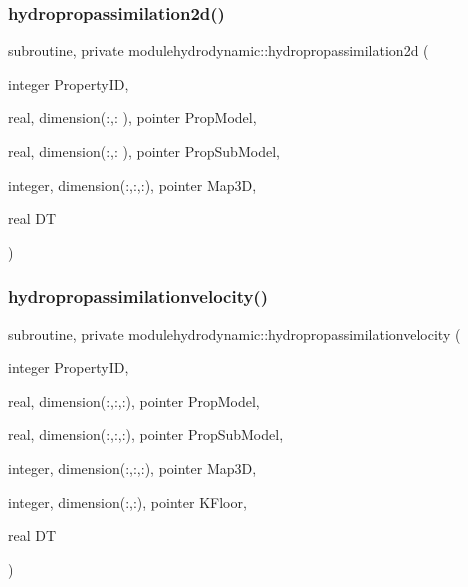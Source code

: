 \subsubsection{\texorpdfstring{hydropropassimilation2d()}{hydropropassimilation2d()}}
{\footnotesize\ttfamily subroutine, private modulehydrodynamic\+::hydropropassimilation2d (\begin{DoxyParamCaption}\item[{integer}]{Property\+ID,  }\item[{real, dimension(\+:,\+:  ), pointer}]{Prop\+Model,  }\item[{real, dimension(\+:,\+:  ), pointer}]{Prop\+Sub\+Model,  }\item[{integer, dimension(\+:,\+:,\+:), pointer}]{Map3D,  }\item[{real}]{DT }\end{DoxyParamCaption})\hspace{0.3cm}{\ttfamily [private]}}

\mbox{\label{namespacemodulehydrodynamic_a1979e519c233cd0af0ad00eab566a414}} 
\subsubsection{\texorpdfstring{hydropropassimilationvelocity()}{hydropropassimilationvelocity()}}
{\footnotesize\ttfamily subroutine, private modulehydrodynamic\+::hydropropassimilationvelocity (\begin{DoxyParamCaption}\item[{integer}]{Property\+ID,  }\item[{real, dimension(\+:,\+:,\+:), pointer}]{Prop\+Model,  }\item[{real, dimension(\+:,\+:,\+:), pointer}]{Prop\+Sub\+Model,  }\item[{integer, dimension(\+:,\+:,\+:), pointer}]{Map3D,  }\item[{integer, dimension(\+:,\+:), pointer}]{K\+Floor,  }\item[{real}]{DT }\end{DoxyParamCaption})\hspace{0.3cm}{\ttfamily [private]}}

\mbox{\label{namespacemodulehydrodynamic_aad271ff300fe974ab4d13ed6f1bd315d}} 
